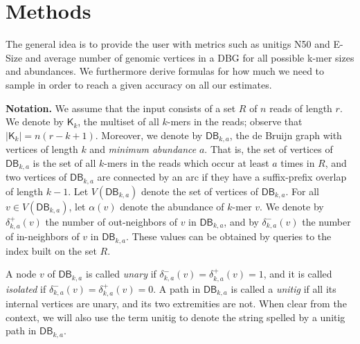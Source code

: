 \documentclass[a4paper,11pt]{article}
\newcommand{\kristoffer}[1]{{\color{red}{#1}}}
\newcommand{\alex}[1]{{\color{blue}{#1}}}
\newcommand{\DB}{\mathsf{DB}_{k,a}}
\newcommand{\dplus}{\delta^+_{k,a}}
\newcommand{\dminus}{\delta^-_{k,a}}
\newcommand{\K}{\mathsf{K}}
\newcommand{\abu}{\alpha}
\begin{document}
\section{Methods} %
\label{sec:methods}

The general idea is to provide the user with metrics such as unitigs N50 and E-Size and average number of genomic vertices in a DBG  for all possible k-mer sizes and abundances. \kristoffer{ We implement a FM-index data structure described in cite XX. This allows us to query a k-mer, its in and out neighbors in O() time. }  We furthermore derive formulas for how much we need to sample in order to reach a given accuracy on all our estimates. 

\noindent \textbf{Notation.} We assume that the input consists of a set $R$ of $n$ reads of length $r$. We denote by $\K_k$, the multiset of all $k$-mers in the reads; observe that $|\K_k| = n(r-k+1)$. Moreover, we denote by $\DB$, the de Bruijn graph with vertices of length $k$ and \emph{minimum abundance} $a$. That is, the set of vertices of $\DB$ is the set of all $k$-mers in the reads which occur at least $a$ times in $R$, and two vertices of $\DB$ are connected by an arc if they have a suffix-prefix overlap of length $k-1$. Let $V(\DB)$ denote the set of vertices of $\DB$. For all $v \in V(\DB)$, let $\abu(v)$ denote the abundance of $k$-mer $v$. We denote by $\dplus(v)$ the number of out-neighbors of $v$ in $\DB$, and by $\dminus(v)$ the number of in-neighbors of $v$ in $\DB$. These values can be obtained by queries to the index built on the set $R$. 

A node $v$ of $\DB$ is called \emph{unary} if $\dminus(v) = \dplus(v) = 1$, and it is called \emph{isolated} if $\dminus(v) = \dplus(v) = 0$. A path in $\DB$ is called a \emph{unitig} if all its internal vertices are unary, and its two extremities are not. When clear from the context, we will also use the term unitig to denote the string spelled by a unitig path in $\DB$. 

\alex{Talk about reverse complements in dB graphs: a k-mer and its reverse complement are bundled into the same node and the abundances are added up. Say how we deal with this case in practice.}

\alex{Give pseudo-code of how we get the in/out degrees for all abundances.}
\end{document}
